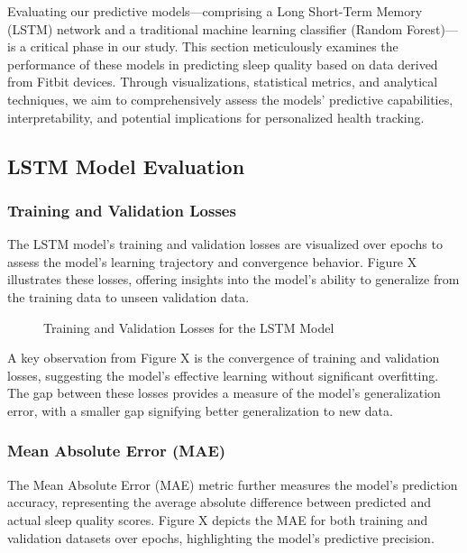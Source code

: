 \documentclass[10pt]{extarticle}
\begin{document}
Evaluating our predictive models---comprising a Long Short-Term Memory (LSTM) network and a traditional machine learning classifier (Random Forest)---is a critical phase in our study. This section meticulously examines the performance of these models in predicting sleep quality based on data derived from Fitbit devices. Through visualizations, statistical metrics, and analytical techniques, we aim to comprehensively assess the models' predictive capabilities, interpretability, and potential implications for personalized health tracking.

\subsection{LSTM Model Evaluation}

\subsubsection{Training and Validation Losses}

The LSTM model's training and validation losses are visualized over epochs to assess the model's learning trajectory and convergence behavior. Figure X illustrates these losses, offering insights into the model's ability to generalize from the training data to unseen validation data.

\begin{figure}[H]
    \centering
    \caption{Training and Validation Losses for the LSTM Model}
\end{figure}

A key observation from Figure X is the convergence of training and validation losses, suggesting the model's effective learning without significant overfitting. The gap between these losses provides a measure of the model's generalization error, with a smaller gap signifying better generalization to new data.

\subsubsection{Mean Absolute Error (MAE)}

The Mean Absolute Error (MAE) metric further measures the model's prediction accuracy, representing the average absolute difference between predicted and actual sleep quality scores. Figure X depicts the MAE for both training and validation datasets over epochs, highlighting the model's predictive precision.
\end{document}
